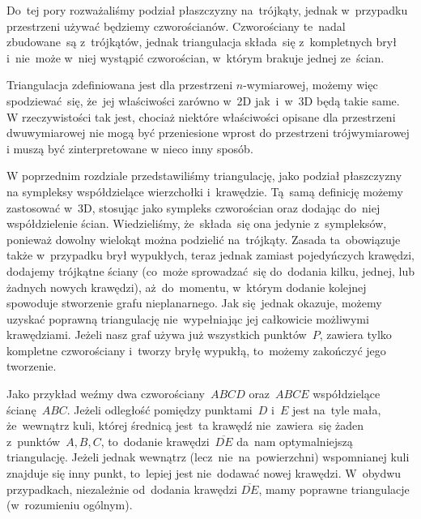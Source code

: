 \documentclass[skorowidz,autorrok,backref,xodstep,oswiadczenie]{wmimgr}
\begin{document}
Do~tej pory rozważaliśmy podział płaszczyzny na~trójkąty, jednak w~przypadku przestrzeni używać będziemy czworościanów. Czworościany te~nadal zbudowane~są z~trójkątów, jednak triangulacja składa~się z~kompletnych brył i~nie~może w~niej wystąpić czworościan, w~którym brakuje jednej ze~ścian.

Triangulacja zdefiniowana jest dla przestrzeni $n$-wymiarowej, możemy więc spodziewać~się, że~jej właściwości zarówno w~2D jak~i~w~3D będą takie same. W rzeczywistości tak jest, chociaż niektóre właściwości opisane dla przestrzeni dwuwymiarowej nie mogą być przeniesione wprost do przestrzeni trójwymiarowej i muszą być zinterpretowane w nieco inny sposób.

W poprzednim rozdziale przedstawiliśmy triangulację, jako podział płaszczyzny na sympleksy współdzielące wierzchołki i~krawędzie. Tą~samą definicję możemy zastosować w~3D, stosując jako sympleks czworościan oraz dodając do~niej współdzielenie ścian. Wiedzieliśmy, że~składa~się ona jedynie z~sympleksów, ponieważ dowolny wielokąt można podzielić na~trójkąty. Zasada ta~obowiązuje także w~przypadku brył wypukłych, teraz jednak zamiast pojedyńczych krawędzi, dodajemy trójkątne ściany (co~może sprowadzać~się do~dodania kilku, jednej, lub żadnych nowych krawędzi), aż~do~momentu, w~którym dodanie kolejnej spowoduje stworzenie grafu nieplanarnego. Jak się~jednak okazuje, możemy uzyskać poprawną triangulację nie~wypełniając jej całkowicie możliwymi krawędziami. Jeżeli nasz graf używa już wszystkich punktów~$P$, zawiera tylko kompletne czworościany i~tworzy bryłę wypukłą, to~możemy zakończyć jego tworzenie.

Jako przykład weźmy dwa czworościany~$A B C D$ oraz~$A B C E$ współdzielące ścianę~$A B C$. Jeżeli odległość pomiędzy punktami~$D$ i~$E$ jest na~tyle mała, że~wewnątrz kuli, której średnicą jest~ta krawędź nie~zawiera~się żaden z~punktów~$A, B, C$, to~dodanie krawędzi~$\overline{D E}$ da~nam optymalniejszą triangulację. Jeżeli jednak wewnątrz (lecz~nie~na~powierzchni) wspomnianej kuli znajduje się inny punkt, to~lepiej jest nie~dodawać nowej krawędzi. W~obydwu przypadkach, niezależnie od~dodania krawędzi $\overline{D E}$, mamy poprawne triangulacje (w~rozumieniu ogólnym).
\end{document}
